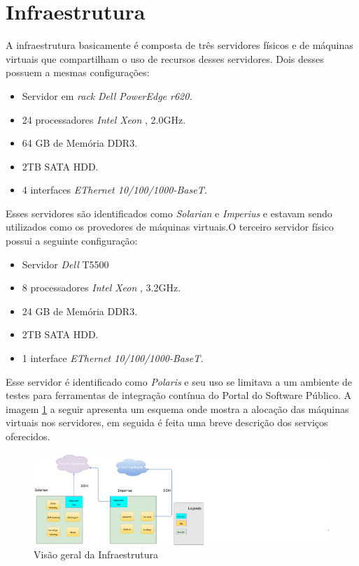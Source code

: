 \section{Infraestrutura}
A infraestrutura basicamente é composta de três servidores físicos e de máquinas virtuais que compartilham o uso de recursos desses servidores. Dois desses possuem a mesmas configurações: 
\begin{itemize}
	\item Servidor em \textit{rack} \textit{Dell PowerEdge r620.}
	\item 24 processadores \textit{Intel Xeon }, 2.0GHz.
	\item 64 GB de Memória DDR3.
	\item 2TB SATA HDD.
	\item 4 interfaces \textit{EThernet 10/100/1000-BaseT.}
\end{itemize}
Esses servidores são identificados como \textit{Solarian} e \textit{Imperius} e estavam sendo utilizados como os provedores de máquinas virtuais.O terceiro servidor físico possui a seguinte configuração:
\begin{itemize}
	\item Servidor \textit{Dell} T5500
	\item 8 processadores \textit{Intel Xeon }, 3.2GHz.
	\item 24 GB de Memória DDR3.
	\item 2TB SATA HDD.
	\item 1 interface \textit{EThernet 10/100/1000-BaseT.}
\end{itemize} 
Esse servidor é identificado como \textit{Polaris} e seu uso se limitava a um ambiente de testes para ferramentas de integração contínua do Portal do Software Público. A imagem \ref{fig:infra_older} a seguir apresenta um esquema onde mostra a alocação das máquinas virtuais nos servidores, em seguida é feita uma breve descrição dos serviços oferecidos.

\begin{figure}[!h]
\centering
\includegraphics [keepaspectratio=true,scale=0.4]{figuras/vm_infra_older.eps}
\caption{Visão geral da Infraestrutura}
\label{fig:infra_older}
\end{figure}

